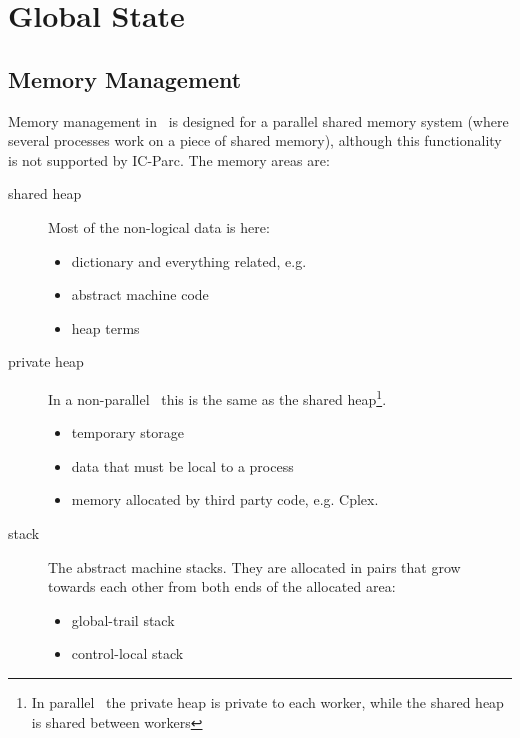 %
% 
% 
% 
% 
\chapter{Global State}

\section{Memory Management}
Memory management in \eclipse\ is designed for a parallel
shared memory system (where several processes work on a piece of
shared memory), although this functionality is not
supported by IC-Parc.
The memory areas are:
\begin{description}
\item[shared heap]
    Most of the non-logical data is here:
    \begin{itemize}
    \item dictionary and everything related, e.g.
    \item abstract machine code
    \item heap terms
    \end{itemize}
\item[private heap]
    In a non-parallel \eclipse\ this is the same as the shared heap\footnote{
    In parallel \eclipse\ the private heap is private to each worker, while
    the shared heap is shared between workers}.
    \begin{itemize}
    \item temporary storage
    \item data that must be local to a process
    \item memory allocated by third party code, e.g. Cplex.
    \end{itemize}
\item[stack]
    The abstract machine stacks. They are allocated in pairs
    that grow towards each other from both ends of the allocated
    area:
    \begin{itemize}
    \item global-trail stack
    \item control-local stack
    \end{itemize}
\end{description}

